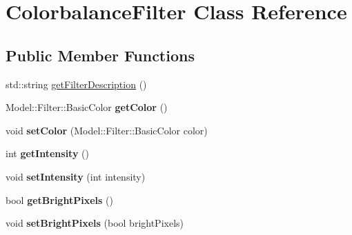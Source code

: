\hypertarget{classModel_1_1Filter_1_1ColorbalanceFilter}{}\section{Colorbalance\+Filter Class Reference}
\label{classModel_1_1Filter_1_1ColorbalanceFilter}
\subsection*{Public Member Functions}
\begin{DoxyCompactItemize}
\item 
std\+::string \hyperlink{classModel_1_1Filter_1_1ColorbalanceFilter_a2b3f7d8fcd3d774b4a2fde5914a9729f}{get\+Filter\+Description} ()
\item 
\hypertarget{classModel_1_1Filter_1_1ColorbalanceFilter_a82047004348409d221728e88c0b9dfa7}{}Model\+::\+Filter\+::\+Basic\+Color {\bfseries get\+Color} ()\label{classModel_1_1Filter_1_1ColorbalanceFilter_a82047004348409d221728e88c0b9dfa7}

\item 
\hypertarget{classModel_1_1Filter_1_1ColorbalanceFilter_a353ae5c263a046f9ef3b72438cfecd95}{}void {\bfseries set\+Color} (Model\+::\+Filter\+::\+Basic\+Color color)\label{classModel_1_1Filter_1_1ColorbalanceFilter_a353ae5c263a046f9ef3b72438cfecd95}

\item 
\hypertarget{classModel_1_1Filter_1_1ColorbalanceFilter_a708995fb1b6acb31ee0dfb0f4881e5b5}{}int {\bfseries get\+Intensity} ()\label{classModel_1_1Filter_1_1ColorbalanceFilter_a708995fb1b6acb31ee0dfb0f4881e5b5}

\item 
\hypertarget{classModel_1_1Filter_1_1ColorbalanceFilter_ac8255ffbc46bb61acaa8fd23d0d260eb}{}void {\bfseries set\+Intensity} (int intensity)\label{classModel_1_1Filter_1_1ColorbalanceFilter_ac8255ffbc46bb61acaa8fd23d0d260eb}

\item 
\hypertarget{classModel_1_1Filter_1_1ColorbalanceFilter_a1be0d343ed58d5d5bf7b816da375f190}{}bool {\bfseries get\+Bright\+Pixels} ()\label{classModel_1_1Filter_1_1ColorbalanceFilter_a1be0d343ed58d5d5bf7b816da375f190}

\item 
\hypertarget{classModel_1_1Filter_1_1ColorbalanceFilter_af0f286aa4c54fb1fd5813d02799da1cb}{}void {\bfseries set\+Bright\+Pixels} (bool bright\+Pixels)\label{classModel_1_1Filter_1_1ColorbalanceFilter_af0f286aa4c54fb1fd5813d02799da1cb}


\end{DoxyCompactItemize}
